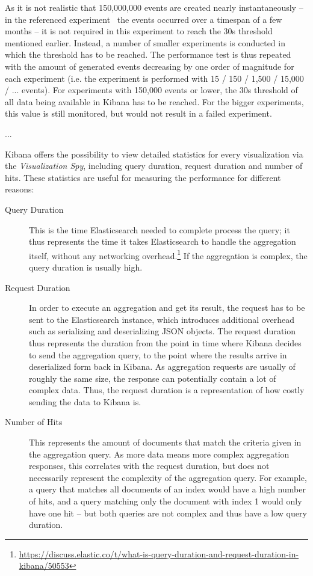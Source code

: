 As it is not realistic that 150,000,000 events are created nearly instantaneously -- in the referenced experiment~\cite{Henze2011} the events occurred over a timespan of a few months -- it is not required in this experiment to reach the 30s threshold mentioned earlier.
Instead, a number of smaller experiments is conducted in which the threshold has to be reached.
The performance test is thus repeated with the amount of generated events decreasing by one order of magnitude for each experiment (i.e. the experiment is performed with 15 / 150 / 1,500 / 15,000 / ... events).
For experiments with 150,000 events or lower, the 30s threshold of all data being available in Kibana has to be reached.
For the bigger experiments, this value is still monitored, but would not result in a failed experiment.

...

Kibana offers the possibility to view detailed statistics for every visualization via the \emph{Visualization Spy}, including query duration, request duration and number of hits.
These statistics are useful for measuring the performance for different reasons:

\begin{description}
\item[Query Duration] This is the time Elasticsearch needed to complete process the query; it thus represents the time it takes Elasticsearch to handle the aggregation itself, without any networking overhead.\footnote{\url{https://discuss.elastic.co/t/what-is-query-duration-and-request-duration-in-kibana/50553}}
If the aggregation is complex, the query duration is usually high.
\item[Request Duration] In order to execute an aggregation and get its result, the request has to be sent to the Elasticsearch instance, which introduces additional overhead such as serializing and deserializing \ac{JSON} objects.
The request duration thus represents the duration from the point in time where Kibana decides to send the aggregation query, to the point where the results arrive in deserialized form back in Kibana.
As aggregation requests are usually of roughly the same size, the response can potentially contain a lot of complex data.
Thus, the request duration is a representation of how costly sending the data to Kibana is.
\item[Number of Hits] This represents the amount of documents that match the criteria given in the aggregation query.
As more data means more complex aggregation responses, this correlates with the request duration, but does not necessarily represent the complexity of the aggregation query.
For example, a query that matches all documents of an index would have a high number of hits, and a query matching only the document with index 1 would only have one hit -- but both queries are not complex and thus have a low query duration.
\end{description}

